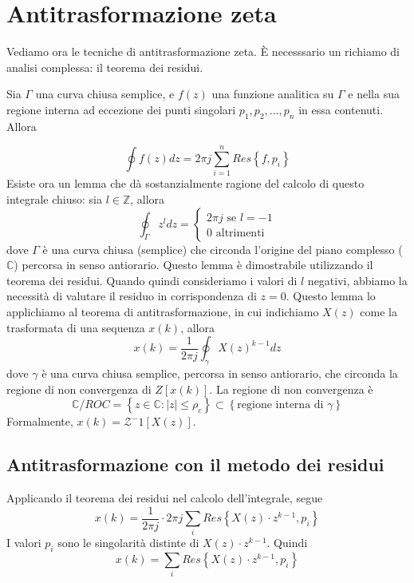 \documentclass[11pt]{article}
\newcommand{\trz}{\mathcal{Z}}
\begin{document}
\section{Antitrasformazione zeta}
Vediamo ora le tecniche di antitrasformazione zeta. È necesssario un richiamo di analisi complessa: il teorema dei residui.
\begin{center}
    Sia $\Gamma$ una curva chiusa semplice, e $f(z)$ una funzione analitica su $\Gamma$ e nella sua regione interna ad eccezione dei punti singolari $p_1,p_2,\dots,p_n$ in essa contenuti. Allora
\end{center}
\begin{displaymath}
    \oint f(z)dz=2\pi j \sum_{i=1}^n Res\left\{f,p_i\right\}
\end{displaymath}
Esiste ora un lemma che dà sostanzialmente ragione del calcolo di questo integrale chiuso: sia $l\in \mathbb{Z}$, allora
\begin{displaymath}
    \oint_\Gamma z^l dz = \begin{cases}
        2\pi j \textrm{ se }l=-1 \\
        0\textrm{ altrimenti}
    \end{cases}
\end{displaymath}
dove $\Gamma$ è una curva chiusa (semplice) che circonda l'origine del piano complesso ($\mathbb{C}$) percorsa in senso antiorario. Questo lemma è dimostrabile utilizzando il teorema dei residui. Quando quindi consideriamo i valori di $l$ negativi, abbiamo la necessità di valutare il residuo in corrispondenza di $z=0$. Questo lemma lo applichiamo al teorema di antitrasformazione, in cui indichiamo $X(z)$ come la trasformata di una sequenza $x(k)$, allora
\begin{displaymath}
    x(k)=\frac{1}{2\pi j}\oint_\gamma X(z)^{k-1}dz
\end{displaymath}
dove $\gamma$ è una curva chiusa semplice, percorsa in senso antiorario, che circonda la regione di non convergenza di $Z[x(k)]$. La regione di non convergenza è
\begin{displaymath}
    \mathbb{C}/ROC = \left\{z \in \mathbb{C} : |z|\le \rho_c\right\} \subset \left\{\textrm{regione interna di }\gamma\right\}
\end{displaymath}
Formalmente, $x(k)=\trz^-1[X(z)]$.
\subsection{Antitrasformazione con il metodo dei residui}
Applicando il teorema dei residui nel calcolo dell'integrale, segue
\begin{displaymath}
    x(k)=\frac{1}{2\pi j}\cdot 2\pi j \sum_i Res \left\{X(z)\cdot z^{k-1}, p_i\right\}
\end{displaymath}
I valori $p_i$ sono le singolarità distinte di $X(z) \cdot z^{k-1}$.
Quindi
\begin{displaymath}
    x(k)=\sum_i Res \left\{X(z)\cdot z^{k-1}, p_i\right\}
\end{displaymath}
\end{document}
